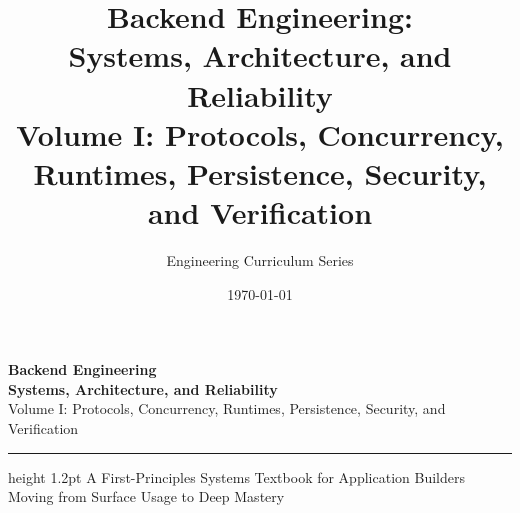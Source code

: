 \documentclass[11pt,oneside]{book}
\title{\Huge\sffamily\bfseries\color{headingblue} Backend Engineering:\\ Systems, Architecture, and Reliability\\[10pt]
\Large\sffamily\color{gray} Volume I: Protocols, Concurrency, Runtimes, Persistence, Security, and Verification}
\author{\large\sffamily Engineering Curriculum Series}
\date{\sffamily \today}
\begin{document}
\frontmatter
\pagestyle{empty}

\begin{center}
  \vspace*{2.5cm}
  {\Huge\sffamily\bfseries\color{headingblue} Backend Engineering}\\[12pt]
  {\LARGE\sffamily\bfseries\color{headingblue} Systems, Architecture, and Reliability}\\[18pt]
  {\Large\sffamily\color{gray} Volume I: Protocols, Concurrency, Runtimes, Persistence, Security, and Verification}\\[30pt]
  \hrule height 1.2pt
  \vspace*{25pt}
  {\normalsize\sffamily A First-Principles Systems Textbook for Application Builders Moving from Surface Usage to Deep Mastery}
\end{center}

\vspace{3.0cm}
\end{document}
